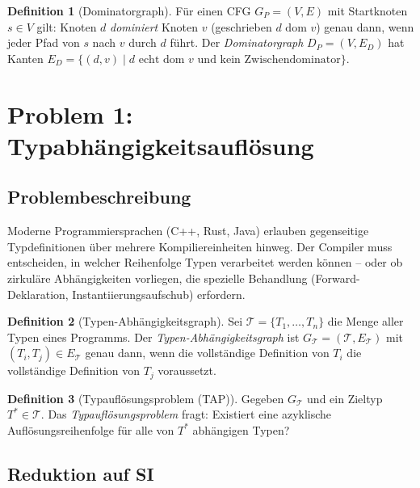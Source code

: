 ﻿\documentclass[a4paper,12pt]{article}
\theoremstyle{definition}
\newtheorem{definition}{Definition}
\begin{document}
\begin{definition}[Dominatorgraph]
\label{def:dom}
Für einen CFG $G_P = (V, E)$ mit Startknoten $s \in V$ gilt: Knoten $d$ \emph{dominiert} Knoten $v$ (geschrieben $d \text{ dom } v$) genau dann, wenn jeder Pfad von $s$ nach $v$ durch $d$ führt. Der \emph{Dominatorgraph} $D_P = (V, E_D)$ hat Kanten $E_D = \{(d, v) \mid d \text{ echt dom } v \text{ und kein Zwischendominator}\}$.
\end{definition}

\section{Problem 1: Typabhängigkeitsauflösung}
\label{sec:typ}

\subsection{Problembeschreibung}

Moderne Programmiersprachen (C++, Rust, Java) erlauben gegenseitige Typdefinitionen über mehrere Kompiliereinheiten hinweg. Der Compiler muss entscheiden, in welcher Reihenfolge Typen verarbeitet werden können -- oder ob zirkuläre Abhängigkeiten vorliegen, die spezielle Behandlung (Forward-Deklaration, Instantiierungsaufschub) erfordern.

\begin{definition}[Typen-Abhängigkeitsgraph]
\label{def:tag}
Sei $\mathcal{T} = \{T_1, \ldots, T_n\}$ die Menge aller Typen eines Programms. Der \emph{Typen-Abhängigkeitsgraph} ist $G_{\mathcal{T}} = (\mathcal{T}, E_{\mathcal{T}})$ mit $(T_i, T_j) \in E_{\mathcal{T}}$ genau dann, wenn die vollständige Definition von $T_i$ die vollständige Definition von $T_j$ voraussetzt.
\end{definition}

\begin{definition}[Typauflösungsproblem (TAP)]
\label{def:tap}
Gegeben $G_{\mathcal{T}}$ und ein Zieltyp $T^* \in \mathcal{T}$. Das \emph{Typauflösungsproblem} fragt: Existiert eine azyklische Auflösungsreihenfolge für alle von $T^*$ abhängigen Typen?
\end{definition}

\subsection{Reduktion auf SI}
\end{document}
